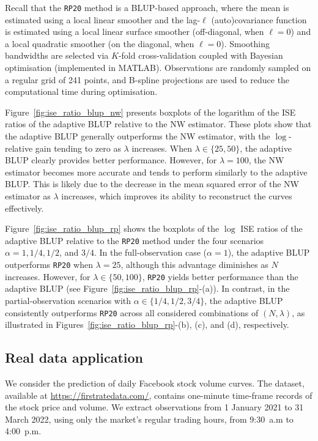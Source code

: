 Recall that the \texttt{RP20} method is a BLUP-based approach, where the mean is estimated using a local linear smoother and the lag-$\ell$ (auto)covariance function is estimated using a local linear surface smoother (off-diagonal, when $\ell = 0$) and a local quadratic smoother (on the diagonal, when $\ell = 0$). Smoothing bandwidths are selected via $K$-fold cross-validation coupled with Bayesian optimisation (implemented in MATLAB). Observations are randomly sampled on a regular grid of 241 points, and B-spline projections are used to reduce the computational time during optimisation.

Figure~\ref{fig:ise_ratio_blup_nw} presents boxplots of the logarithm of the ISE ratios of the adaptive BLUP relative to the NW estimator. These plots show that the adaptive BLUP generally outperforms the NW estimator, with the $\log$-relative gain tending to zero as $\lambda$ increases. When $\lambda \in \{25, 50\}$, the adaptive BLUP clearly provides better performance. However, for $\lambda = 100$, the NW estimator becomes more accurate and tends to perform similarly to the adaptive BLUP. This is likely due to the decrease in the mean squared error of the NW estimator as $\lambda$ increases, which improves its ability to reconstruct the curves effectively.

Figure~\ref{fig:ise_ratio_blup_rp} shows the boxplots of the $\log$ ISE ratios of the adaptive BLUP relative to the \texttt{RP20} method under the four scenarios $\alpha = 1, 1/4, 1/2$, and $3/4$. In the full-observation case ($\alpha = 1$), the adaptive BLUP outperforms \texttt{RP20} when $\lambda = 25$, although this advantage diminishes as $N$ increases. However, for $\lambda \in \{50, 100\}$, \texttt{RP20} yields better performance than the adaptive BLUP (see Figure~\ref{fig:ise_ratio_blup_rp}-(a)). In contrast, in the partial-observation scenarios with $\alpha \in \{1/4, 1/2, 3/4\}$, the adaptive BLUP consistently outperforms \texttt{RP20} across all considered combinations of $(N, \lambda)$, as illustrated in Figures~\ref{fig:ise_ratio_blup_rp}-(b), (c), and (d), respectively.



\subsection{Real data application}
We consider the prediction of daily Facebook stock volume curves. The dataset, available at \url{https://firstratedata.com/}, contains one-minute time-frame records of the stock price and volume. We extract observations from 1 January 2021 to 31 March 2022, using only the market’s regular trading hours, from 9:30~a.m to 4:00~p.m.

